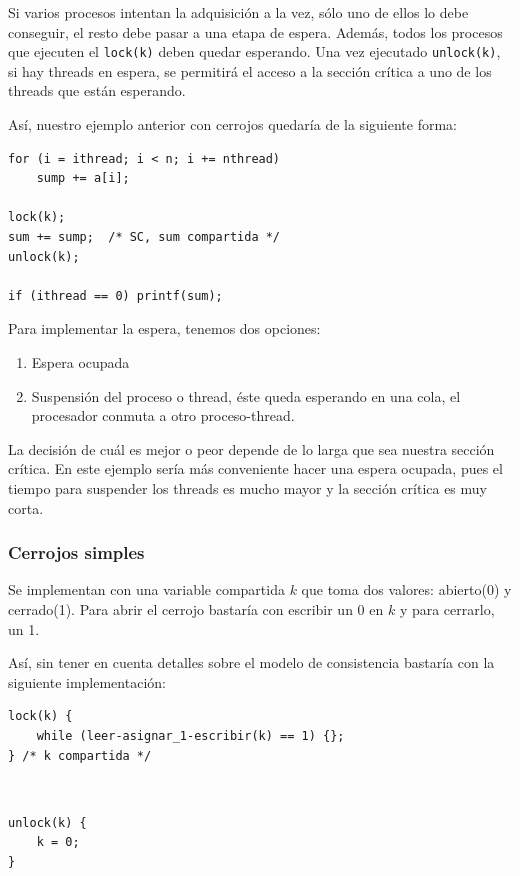 \documentclass[10pt,a4paper,spanish]{report}
\begin{document}
Si varios procesos intentan la adquisición a la vez, sólo uno de ellos lo debe conseguir, el resto debe pasar a una etapa de espera. Además, todos los procesos que ejecuten el \verb*|lock(k)| deben quedar esperando. Una vez ejecutado \verb*|unlock(k)|, si hay threads en espera, se permitirá el acceso a la sección crítica a uno de los threads que están esperando.

Así, nuestro ejemplo anterior con cerrojos quedaría de la siguiente forma:

\begin{verbatim}
for (i = ithread; i < n; i += nthread)
    sump += a[i];

lock(k);
sum += sump;  /* SC, sum compartida */
unlock(k);

if (ithread == 0) printf(sum);
\end{verbatim}

Para implementar la espera, tenemos dos opciones:
\begin{enumerate}[\color{azul}{\bf $\heartsuit$}]
    \item Espera ocupada
    \item Suspensión del proceso o thread, éste queda esperando en una cola, el procesador conmuta a otro proceso-thread.
\end{enumerate}

La decisión de cuál es mejor o peor depende de lo larga que sea nuestra sección crítica. En este ejemplo sería más conveniente hacer una espera ocupada, pues el tiempo para suspender los threads es mucho mayor y la sección crítica es muy corta.

\textcolor[rgb]{0.2,0.4,0.8}{\subsubsection{Cerrojos simples}}
Se implementan con una variable compartida $k$ que toma dos valores: abierto(0) y cerrado(1). Para abrir el cerrojo bastaría con escribir un 0 en $k$ y para cerrarlo, un 1.

Así, sin tener en cuenta detalles sobre el modelo de consistencia bastaría con la siguiente implementación:

\begin{center}
\begin{minipage}{0.6\textwidth}
\begin{verbatim}
lock(k) {
    while (leer-asignar_1-escribir(k) == 1) {};
} /* k compartida */
\end{verbatim}
\end{minipage}
\begin{minipage}{0.1\textwidth}
\textcolor{White}{.}
\end{minipage}
\begin{minipage}{0.2\textwidth}
\begin{verbatim}
unlock(k) {
    k = 0;
}
\end{verbatim}
\end{minipage}
\end{center}
\end{document}
